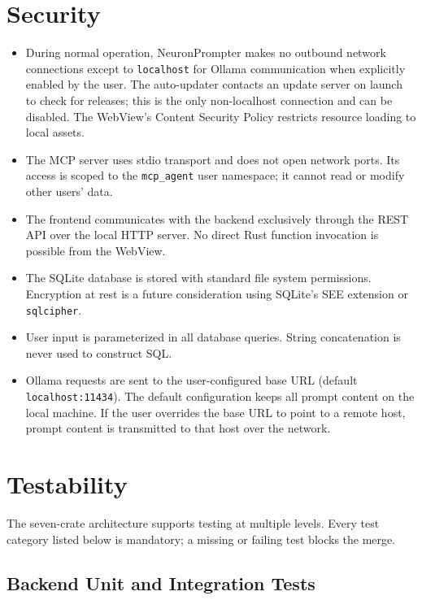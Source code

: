 \documentclass[a4paper, 11pt, oneside]{report}
\begin{document}
\section{Security}
\label{sec:security}

\begin{itemize}
  \item During normal operation, NeuronPrompter makes no outbound network
        connections except to \texttt{localhost} for Ollama communication
        when explicitly enabled by the user.  The auto-updater contacts
        an update server on launch to check for releases; this is the
        only non-localhost connection and can be disabled.  The WebView's Content Security Policy restricts
        resource loading to local assets.
  \item The MCP server uses stdio transport and does not open network
        ports.  Its access is scoped to the \texttt{mcp\_agent} user
        namespace; it cannot read or modify other users' data.
  \item The frontend communicates with the backend exclusively through
        the REST API over the local HTTP server.  No direct Rust function
        invocation is possible from the WebView.
  \item The SQLite database is stored with standard file system
        permissions.  Encryption at rest is a future consideration
        using SQLite's SEE extension or \texttt{sqlcipher}.
  \item User input is parameterized in all database queries.  String
        concatenation is never used to construct SQL.
  \item Ollama requests are sent to the user-configured base URL
        (default \texttt{localhost:11434}).  The default configuration
        keeps all prompt content on the local machine.  If the user
        overrides the base URL to point to a remote host, prompt
        content is transmitted to that host over the network.
\end{itemize}

\section{Testability}
\label{sec:testability}

The seven-crate architecture supports testing at multiple levels.
Every test category listed below is mandatory; a missing or failing
test blocks the merge.

\subsection{Backend Unit and Integration Tests}
\label{sec:backend-tests}
\end{document}
